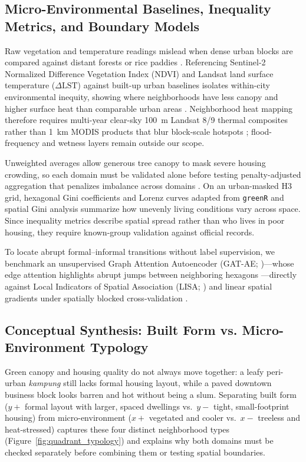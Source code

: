 \subsection{Micro-Environmental Baselines, Inequality Metrics, and Boundary Models}
Raw vegetation and temperature readings mislead when dense urban blocks are compared against distant forests or rice paddies \citep{Chakraborty2019a, Stewart2012}. Referencing Sentinel-2 Normalized Difference Vegetation Index (NDVI) and Landsat land surface temperature ($\Delta\text{LST}$) against built-up urban baselines isolates within-city environmental inequity, showing where neighborhoods have less canopy and higher surface heat than comparable urban areas \citep{Chakraborty2019b, Hsu2021}. Neighborhood heat mapping therefore requires multi-year clear-sky 100~m Landsat 8/9 thermal composites rather than 1~km MODIS products that blur block-scale hotspots \citep{Voogt2003}; flood-frequency and wetness layers remain outside our scope.

Unweighted averages allow generous tree canopy to mask severe housing crowding, so each domain must be validated alone before testing penalty-adjusted aggregation that penalizes imbalance across domains \citep{Mazziotta2016, OECD2008}. On an urban-masked H3 grid, hexagonal Gini coefficients and Lorenz curves adapted from \texttt{greenR} \citep{Mahajan2024} and spatial Gini analysis \citep{Rey2013} summarize how unevenly living conditions vary across space. Since inequality metrics describe spatial spread rather than who lives in poor housing, they require known-group validation against official records.

To locate abrupt formal--informal transitions without label supervision, we benchmark an unsupervised Graph Attention Autoencoder (GAT-AE; \citealt{Salehi2020, Velickovic2018})---whose edge attention highlights abrupt jumps between neighboring hexagons \citep{Ding2019}---directly against Local Indicators of Spatial Association (LISA; \citealt{Anselin1995}) and linear spatial gradients under spatially blocked cross-validation \citep{Roberts2017}.

\subsection{Conceptual Synthesis: Built Form vs. Micro-Environment Typology}
Green canopy and housing quality do not always move together: a leafy peri-urban \textit{kampung} still lacks formal housing layout, while a paved downtown business block looks barren and hot without being a slum. Separating built form ($y+$ formal layout with larger, spaced dwellings vs.\ $y-$ tight, small-footprint housing) from micro-environment ($x+$ vegetated and cooler vs.\ $x-$ treeless and heat-stressed) captures these four distinct neighborhood types (Figure~\ref{fig:quadrant_typology}) and explains why both domains must be checked separately before combining them or testing spatial boundaries.

